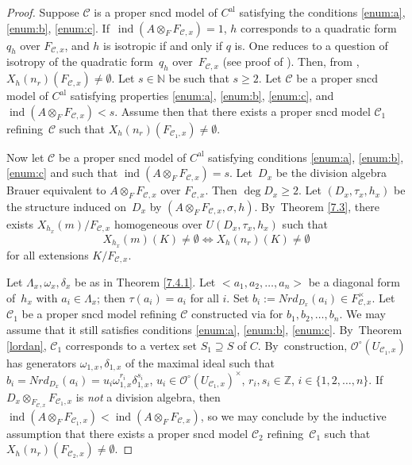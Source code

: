\documentclass[10pt]{amsart}
\newcommand{\al}{\mathrm{al}}
\DeclareMathOperator{\ind}{ind}
\theoremstyle{definition}
\begin{document}
\begin{proof}
Suppose $\mathscr{C}$ is a proper sncd model of $C^{\al}$ satisfying the conditions \eqref{enum:a}, \eqref{enum:b}, \eqref{enum:c}. If~$\ind(A \otimes_F F_{\mathscr{C},x})=1$, $h$ corresponds to a quadratic form $q_h$ over $F_{\mathscr{C},x}$, and $h$ is isotropic if and only if $q$ is. One reduces to a question of isotropy of the quadratic form~$q_h$ over~$F_{\mathscr{C},x}$ (see proof of \cite[Th.\,12.2]{parsur}). Then, from \cite[Cor.\,4.7]{hhk10}, $X_h(n_r)(F_{\mathscr{C},x}) \neq \emptyset$.
Let $s \in \mathbb{N}$ be such that $s \geqslant 2$. Let $\mathscr{C}$ be a proper sncd model of $C^{\al}$ satisfying properties \eqref{enum:a}, \eqref{enum:b}, \eqref{enum:c}, and $\ind(A \otimes_F F_{\mathscr{C},x})< s$. Assume then that there exists a proper sncd model $\mathscr{C}_1$ refining~$\mathscr{C}$ such that $X_h(n_r)(F_{\mathscr{C}_1,x}) \neq \emptyset$.

Now let $\mathscr{C}$ be a proper sncd model of $C^{\al}$ satisfying conditions \eqref{enum:a}, \eqref{enum:b}, \eqref{enum:c} and such that $\ind(A \otimes_F F_{\mathscr{C},x})=s$. Let~$D_x$ be the division algebra Brauer equivalent to $A \otimes_F F_{\mathscr{C},x}$ over $F_{\mathscr{C},x}$. Then ${\deg{D_x} \geqslant 2}$. Let $(D_x, \tau_x, h_x)$ be the structure induced on~$D_x$ by ${(A \otimes_F F_{\mathscr{C},x}, \sigma, h)}$. By~Theorem \ref{7.3}, there exists $X_{h_x}(m)/F_{\mathscr{C},x}$ homogeneous over $\textit{U}(D_x, \tau_x, h_x)$ such that
\[
{X_{h_x}(m)(K) \neq \emptyset} \iff X_h(n_r)(K) \neq \emptyset
\]
for all extensions $K/F_{\mathscr{C},x}$.

Let $\Lambda_x, \omega_x, \delta_x$ be as in Theorem \ref{7.4.1}. Let $<a_1, a_2, \dots, a_n>$ be a diagonal form of~$h_x$ with $a_i \in \Lambda_x$; then $\tau(a_i)=a_i$ for all $i$. Set $b_i:=Nrd_{D_x}(a_i) \in F_{\mathscr{C},x}^{\times}$. Let $\mathscr{C}_1$ be a proper sncd model refining $\mathscr{C}$ constructed via \cite[Lem.\,4.3]{wu} for $b_1, b_2, \dots, b_n$. We may assume that it still satisfies conditions \eqref{enum:a}, \eqref{enum:b}, \eqref{enum:c}. By~Theorem \ref{lordan}, $\mathscr{C}_1$ corresponds to a vertex set $S_1 \supseteq S$ of $C$.
By~construction, $\mathcal{O}^{\circ}(U_{\mathscr{C}_1,x})$ has generators $\omega_{1,x}, \delta_{1,x}$ of the maximal ideal such that $b_i=Nrd_{D_x}(a_i)=u_i \omega_{1,x}^{r_i} \delta_{1,x}^{s_i}$, $u_i \in \mathcal{O}^{\circ}(U_{\mathscr{C}_1,x})^{\times}$, $r_i, s_i \in \mathbb{Z}$, $i \in \{1,2,\dots, n\}$. If $D_x \otimes_{F_{\mathscr{C},x}} F_{\mathscr{C}_1,x}$ is \emph{not} a division algebra, then $\ind(A \otimes_F F_{\mathscr{C}_1,x}) < \ind(A \otimes_F F_{\mathscr{C},x})$, so we may conclude by the inductive assumption that there exists a proper sncd model $\mathscr{C}_2$ refining~$\mathscr{C}_1$ such that $X_h(n_r)(F_{\mathscr{C}_2,x}) \neq \emptyset$.


\end{proof}
\end{document}
